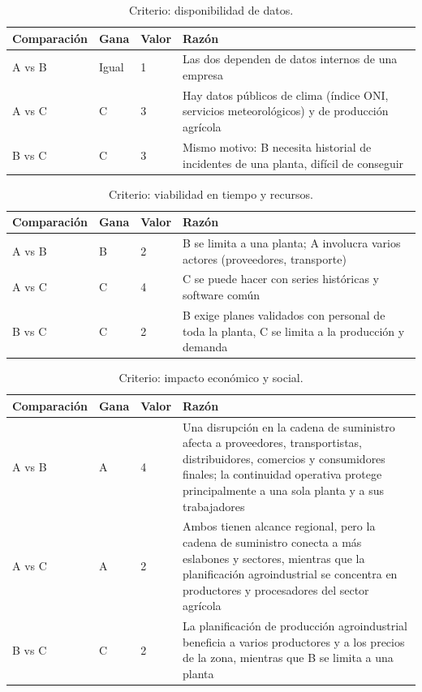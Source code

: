 \documentclass[runningheads]{llncs}
\begin{document}
\begin{table}[H]
\centering
\small
\caption{Criterio: disponibilidad de datos.}
\begin{tabular}{@{}p{2cm}p{1.1cm}p{1cm}p{7.3cm}@{}}
\toprule
Comparación & Gana & Valor & Razón\\
\midrule
A vs B & Igual & 1 & Las dos dependen de datos internos de una empresa\\
A vs C & C & 3 & Hay datos públicos de clima (índice ONI, servicios meteorológicos) y de producción agrícola\\
B vs C & C & 3 & Mismo motivo: B necesita historial de incidentes de una planta, difícil de conseguir\\
\bottomrule
\end{tabular}
\end{table}

\begin{table}[H]
\centering
\small
\caption{Criterio: viabilidad en tiempo y recursos.}
\begin{tabular}{@{}p{2cm}p{1.1cm}p{1cm}p{7.3cm}@{}}
\toprule
Comparación & Gana & Valor & Razón\\
\midrule
A vs B & B & 2 & B se limita a una planta; A involucra varios actores (proveedores, transporte)\\
A vs C & C & 4 & C se puede hacer con series históricas y software común\\
B vs C & C & 2 & B exige planes validados con personal de toda la planta, C se limita a la producción y demanda\\
\bottomrule
\end{tabular}
\end{table}

\begin{table}[H]
\centering
\small
\caption{Criterio: impacto económico y social.}
\begin{tabular}{@{}p{2cm}p{1.1cm}p{1cm}p{7.3cm}@{}}
\toprule
Comparación & Gana & Valor & Razón\\
\midrule
A vs B & A & 4 & Una disrupción en la cadena de suministro afecta a proveedores, transportistas, distribuidores, comercios y consumidores finales; la continuidad operativa protege principalmente a una sola planta y a sus trabajadores\\
A vs C & A & 2 & Ambos tienen alcance regional, pero la cadena de suministro conecta a más eslabones y sectores, mientras que la planificación agroindustrial se concentra en productores y procesadores del sector agrícola\\
B vs C & C & 2 & La planificación de producción agroindustrial beneficia a varios productores y a los precios de la zona, mientras que B se limita a una planta\\
\bottomrule
\end{tabular}
\end{table}
\end{document}
